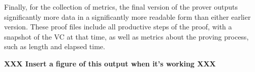 Finally, for the collection of metrics, the final version of the prover outputs significantly more data in a significantly more readable form than either earlier version.  These proof files include all productive steps of the proof, with a snapshot of the VC at that time, as well as metrics about the proving process, such as length and elapsed time.

\textbf{XXX Insert a figure of this output when it's working XXX}
